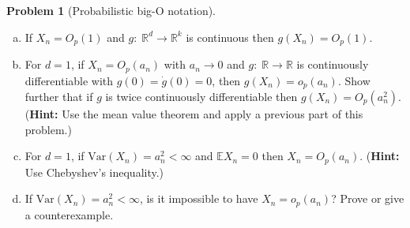\documentclass{article}
\newcommand{\EE}{\mathbb{E}}
\newcommand{\RR}{\mathbb{R}}
\theoremstyle{definition}
\newtheorem{problem}{Problem}
\begin{document}
\begin{problem}[Probabilistic big-O notation]
\begin{enumerate}[(a)]
\item If $X_n = O_p(1)$ and $g:\; \RR^d \to \RR^k$ is continuous then $g(X_n) = O_p(1)$.



\item For $d=1$, if $X_n = O_p(a_n)$ with $a_n \to 0$ and $g:\; \RR \to \RR$ is continuously differentiable with $g(0) = \dot{g}(0) = 0$, then $g(X_n) = o_p(a_n)$. Show further that if $g$ is twice continuously differentiable then $g(X_n) = O_p(a_n^2)$. ({\bf Hint:} Use the mean value theorem and apply a previous part of this problem.)



\item For $d=1$, if $\text{Var}(X_n) = a_n^2 < \infty$ and $\EE X_n = 0$ then $X_n = O_p(a_n)$. ({\bf Hint:} Use Chebyshev's inequality.)



\item If $\text{Var}(X_n) = a_n^2 < \infty$, is it impossible to have $X_n = o_p(a_n)$? Prove or give a counterexample.



\end{enumerate}
\end{problem}




\end{document}
